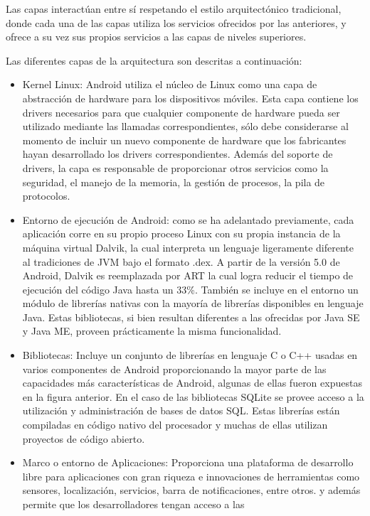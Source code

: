 Las capas interactúan entre sí respetando el estilo arquitectónico
tradicional, donde cada una de las capas utiliza los servicios ofrecidos
por las anteriores, y ofrece a su vez sus propios servicios a las
capas de niveles superiores. 

Las diferentes capas de la arquitectura son descritas a continuación:
\begin{itemize}
\item Kernel Linux: Android utiliza el núcleo de Linux como una capa de
abstracción de hardware para los dispositivos móviles. Esta capa contiene
los drivers necesarios para que cualquier componente de hardware pueda
ser utilizado mediante las llamadas correspondientes, sólo debe considerarse
al momento de incluir un nuevo componente de hardware que los fabricantes
hayan desarrollado los drivers correspondientes. Además del soporte
de drivers, la capa es responsable de proporcionar otros servicios
como la seguridad, el manejo de la memoria, la gestión de procesos,
la pila de protocolos. 
\item Entorno de ejecución de Android: como se ha adelantado previamente,
cada aplicación corre en su propio proceso Linux con su propia instancia
de la máquina virtual Dalvik, la cual interpreta un lenguaje ligeramente
diferente al tradiciones de \ac{JVM} bajo el formato .dex. A partir
de la versión 5.0 de Android, Dalvik es reemplazada por \ac{ART}
la cual logra reducir el tiempo de ejecución del código Java hasta
un 33\%. También se incluye en el entorno un módulo de librerías nativas
con la mayoría de librerías disponibles en lenguaje Java. Estas bibliotecas,
si bien resultan diferentes a las ofrecidas por \ac{Java SE} y \ac{Java ME},
proveen prácticamente la misma funcionalidad. 
\item Bibliotecas: Incluye un conjunto de librerías en lenguaje C o C++
usadas en varios componentes de Android proporcionando la mayor parte
de las capacidades más características de Android, algunas de ellas
fueron expuestas en la figura anterior. En el caso de las bibliotecas
SQLite se provee acceso a la utilización y administración de bases
de datos \ac{SQL}. Estas librerías están compiladas en código nativo
del procesador y muchas de ellas utilizan proyectos de código abierto. 
\item Marco o entorno de Aplicaciones: Proporciona una plataforma de desarrollo
libre para aplicaciones con gran riqueza e innovaciones de herramientas
como sensores, localización, servicios, barra de notificaciones, entre
otros. y además permite que los desarrolladores tengan acceso a las

\end{itemize}
